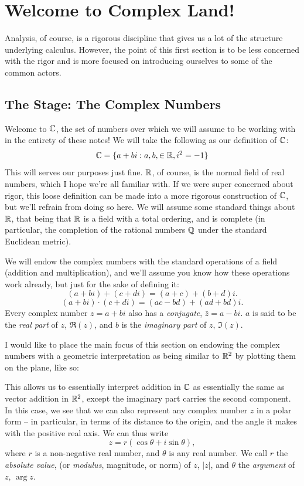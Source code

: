 \section{Welcome to Complex Land!}
Analysis, of course, is a rigorous discipline that gives us a lot of the structure underlying calculus. However, the point of this first section is to be less concerned with the rigor and is more focused on introducing ourselves to some of the common actors.

\subsection{The Stage: The Complex Numbers}

Welcome to $\mathbb C$, the set of numbers over which we will assume to be working with in the entirety of these notes! We will take the following as our definition of $\mathbb C$:
\[
    \mathbb C = \{ a + b i : a, b, \in \mathbb R, i^2 = -1\}
\]
This will serves our purposes just fine. $\mathbb R$, of course, is the normal field of real numbers, which I hope we're all familiar with. If we were super concerned about rigor, this loose definition can be made into a more rigorous construction of $\mathbb C$, but we'll refrain from doing so here. We will assume some standard things about $\mathbb R$, that being that $\mathbb R$ is a field with a total ordering, and is complete (in particular, the completion of the rational numbers $\mathbb Q$ under the standard Euclidean metric).

We will endow the complex numbers with the standard operations of a field (addition and multiplication), and we'll assume you know how these operations work already, but just for the sake of defining it:
\[(a + bi) + (c + di) = (a + c) + (b+ d) i.\]
\[(a + bi) \cdot (c + di) = (ac - bd) + (ad + bd)i. \]
Every complex number $z = a + bi$ also has a \textit{conjugate}, $\bar z = a - bi$. $a$ is said to be the \textit{real part} of $z$, $\Re(z)$, and $b$ is the \textit{imaginary part} of $z$, $\Im(z)$.

I would like to place the main focus of this section on endowing the complex numbers with a geometric interpretation as being similar to $\mathbb R^2$ by plotting them on the plane, like so:


This allows us to essentially interpret addition in $\mathbb C$ as essentially the same as vector addition in $\mathbb R^2$, except the imaginary part carries the second component. In this case, we see that we can also represent any complex number $z$ in a polar form -- in particular, in terms of its distance to the origin, and the angle it makes with the positive real axis. We can thus write
\[
    z = r (\cos \theta + i \sin \theta),
\]
where $r$ is a non-negative real number, and $\theta$ is any real number. We call $r$ the \textit{absolute value}, (or \textit{modulus}, magnitude, or norm) of $z$, $|z|$, and $\theta$ the \textit{argument} of $z$, $\arg z$.

